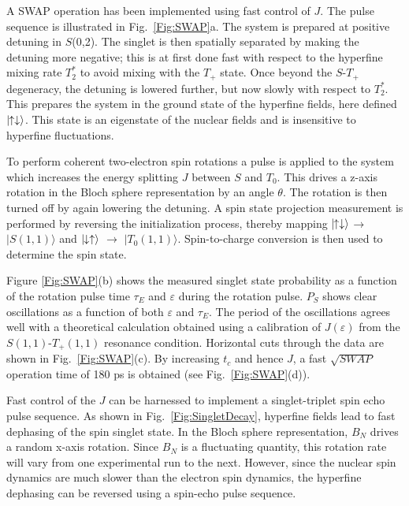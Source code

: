 \documentclass[rmp,twocolumn,aps]{revtex4}
\begin{document}
A SWAP operation has been implemented using fast control of $J$. The pulse sequence is illustrated
in Fig.~\ref{Fig:SWAP}a. The system is prepared at positive
detuning in $S$(0,2). The singlet is then spatially separated by
making the detuning more negative; this is at first done fast with respect to the hyperfine mixing
rate $T_2^*$ to avoid mixing with the $T_+$ state. Once beyond the $S$-$T_+$ degeneracy, the detuning is lowered further, but now slowly with respect to $T_2^*$. This prepares the system in the ground state of the
hyperfine fields, here defined $|\!\!\uparrow\downarrow \rangle$. This
state is an eigenstate of the nuclear fields and is insensitive to
hyperfine fluctuations.

To perform coherent two-electron spin rotations a pulse is
applied to the system which increases the energy splitting $J$ between $S$ and $T_0$. This drives a z-axis rotation in the Bloch sphere representation by an angle $\theta$. The rotation is then turned off
by again lowering the detuning. A spin state projection measurement is
performed by reversing the initialization process, thereby mapping $|\!\!\uparrow\downarrow \rangle$$\rightarrow$
$|S(1,1) \rangle$ and $|\!\!\downarrow\uparrow \rangle$ $\rightarrow$
$|T_0(1,1) \rangle$. Spin-to-charge conversion is then used to
determine the spin state.

Figure \ref{Fig:SWAP}(b) shows the measured singlet state
probability as a function of the rotation pulse time $\tau_E$ and
$\varepsilon$ during the rotation pulse. $P_S$ shows clear
oscillations as a function of both $\varepsilon$ and $\tau_E$. The
period of the oscillations agrees well with a theoretical
calculation obtained using a calibration of $J(\varepsilon)$ from the
$S(1,1)$-$T_+(1,1)$ resonance condition. Horizontal cuts through
the data are shown in Fig.~\ref{Fig:SWAP}(c). By increasing
$t_c$ and hence $J$, a fast $\sqrt{SWAP}$ operation time of 180 ps
is obtained (see Fig.~\ref{Fig:SWAP}(d)).

Fast control of the $J$ can be harnessed to
implement a singlet-triplet spin echo pulse sequence. As shown in
Fig.~\ref{Fig:SingletDecay}, hyperfine fields lead to fast
dephasing of the spin singlet state. In the Bloch sphere
representation, $B_{N}$ drives a random x-axis rotation. Since
$B_{N}$ is a fluctuating quantity, this rotation rate will vary from one experimental run to the
next. However, since the nuclear spin dynamics are much slower
than the electron spin dynamics, the hyperfine dephasing can be
reversed using a spin-echo pulse sequence.
\end{document}
